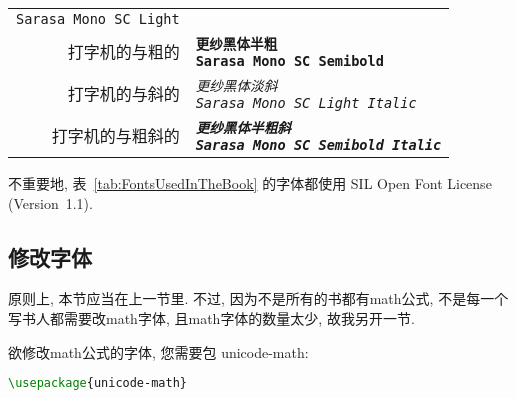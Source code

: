 \begin{longtable}[c]{r|l}
{    \texttt{\textup{Sarasa Mono SC Light}}}                    \\
    打字机的与粗的  &
    \makecell{\texttt{\textbf{更纱黑体半粗}}                         \\
    \texttt{\textbf{Sarasa Mono SC Semibold}}}                 \\
    打字机的与斜的  &
    \makecell{\texttt{\textit{更纱黑体淡斜}}                         \\
    \texttt{\textit{Sarasa Mono SC Light Italic}}}             \\
    打字机的与粗斜的 &
    \makecell{\texttt{\textbf{\textit{更纱黑体半粗斜}}}               \\
    \texttt{\textbf{\textit{Sarasa Mono SC Semibold Italic}}}} \\
\end{longtable}

不重要地, 表~\ref{tab:FontsUsedInTheBook}
的字体都使用 SIL Open Font License (Version~1.1).

\subsection{修改字体}

原则上, 本节应当在上一节里.
不过, 因为不是所有的书都有\gls{math}公式,
不是每一个写书人都需要改\gls{math}字体,
且\gls{math}字体的数量太少,
故我另开一节.

欲修改\gls{math}公式的字体, 您需要包 \textsf{unicode-math}:
\begin{lstlisting}[language=TeX]
\usepackage{unicode-math}
\end{lstlisting}

